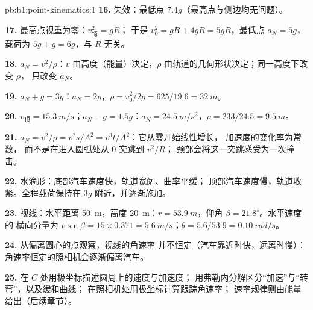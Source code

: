 \begin{solution}{pb:b1:point-kinematics:1}
\textbf{16.} 失效：最低点 $7.4g$（最高点与侧边均无问题）。

\textbf{17.} 最高点视重为零：$v_{\text{顶}}^2 = gR$；
于是 $v_0^2 = gR + 4gR = 5gR$，最低点 $a_N = 5g$，载荷为
$5g + g = 6g$，与 $R$ 无关。

\textbf{18.} $a_N = v^2/\rho$：$v$ 由高度（能量）决定，$\rho$
由轨道的几何形状决定；同一高度下改变 $\rho$，
只改变 $a_N$。

\textbf{19.} $a_N + g = 3g$：$a_N = 2g$，$\rho = v_0^2/2g = 625/19.6 =
\qty{32}{m}$。

\textbf{20.} $v_{\text{顶}} = \qty{15.3}{m/s}$；$a_N - g = 1.5g$：$a_N =
\qty{24.5}{m/s^2}$，$\rho = 233/24.5 = \qty{9.5}{m}$。

\textbf{21.} $a_N = v^2/\rho = v^2s/A^2 = v^3t/A^2$：它从零开始线性增长，
加速度的变化率为常数，
而不是在进入圆弧处从 $0$ 突跳到 $v^2/R$；
颈部会将这一突跳感受为一次撞击。

\textbf{22.} 水滴形：底部汽车速度快，轨道宽阔、曲率平缓；
顶部汽车速度慢，轨道收紧。全程载荷保持在
$3g$ 附近，并逐渐施加。

\textbf{23.} 视线：水平距离 \qty{50}{m}，高度
\qty{20}{m}：$r = \qty{53.9}{m}$，仰角 $\beta = 21.8^\circ$。水平速度的
横向分量为 $v\sin\beta = 15 \times
0.371 = \qty{5.6}{m/s}$；$\dot\theta = 5.6/53.9 = \qty{0.10}{rad/s}$。

\textbf{24.} 从偏离圆心的点观察，视线的角速率
并不恒定（汽车靠近时快，远离时慢）：
角速率恒定的照相机会逐渐偏离汽车。

\textbf{25.} 在 $C$ 处用极坐标描述圆周上的速度与加速度；
用弗勒内分解区分“加速”与“转弯”，以及缓和曲线；
在照相机处用极坐标计算跟踪角速率；
速率规律则由能量给出（后续章节）。
\end{solution}

